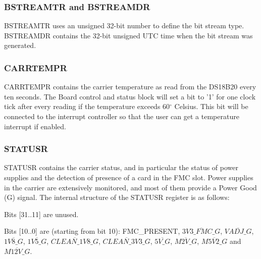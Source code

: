 \documentclass{article}
\newenvironment{packed_item}{
\begin{itemize}
  \setlength{\itemsep}{1pt}
  \setlength{\parskip}{0pt}
  \setlength{\parsep}{0pt}
}{\end{itemize}}
\begin{document}
\subsubsection{BSTREAMTR and BSTREAMDR}
BSTREAMTR uses an unsigned 32-bit number to define the bit stream type. BSTREAMDR contains the 32-bit unsigned UTC time when the bit stream was generated. 

\subsubsection{CARRTEMPR}
CARRTEMPR contains the carrier temperature as read from the DS18B20 every ten seconds. The Board control and status block will set a bit to '1' for one clock tick after every reading if the temperature exceeds 60$^\circ$ Celsius. This bit will be connected to the interrupt controller so that the user can get a temperature interrupt if enabled. 

\subsubsection{STATUSR}
STATUSR contains the carrier status, and in particular the status of power supplies and the detection of presence of a card in the FMC slot. Power supplies in the carrier are extensively monitored, and most of them provide a Power Good (G) signal. The internal structure of the STATUSR register is as follows:
\begin{packed_item}
\item Bits [31..11] are unused.
\item Bits [10..0] are (starting from bit 10): FMC\_PRESENT, $\overline{3V3\_FMC\_G}$,  $\overline{VADJ\_G}$, $\overline{1V8\_G}$,  $\overline{1V5\_G}$,  $\overline{CLEAN\_1V8\_G}$, $\overline{CLEAN\_3V3\_G}$, $\overline{5V\_G}$, \linebreak$\overline{M2V\_G}$, $\overline{M5V2\_G}$ and $\overline{M12V\_G}$.
\end{packed_item}
\end{document}
